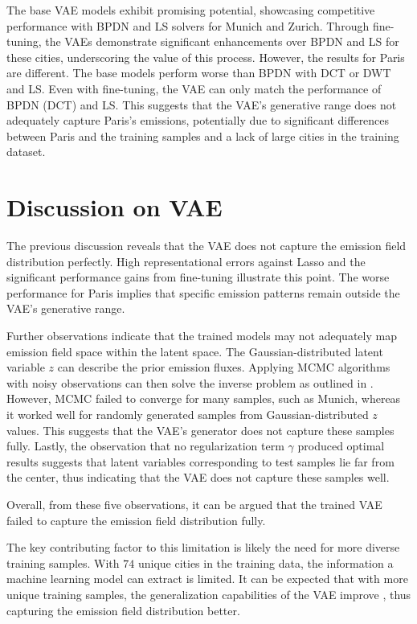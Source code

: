 The base \gls{VAE} models exhibit promising potential, showcasing competitive performance with \gls{BPDN} and \gls{LS} solvers for Munich and Zurich.
Through fine-tuning, the \gls{VAE}s demonstrate significant enhancements over \gls{BPDN} and \gls{LS} for these cities, underscoring the value of this process.
However, the results for Paris are different.
The base models perform worse than \gls{BPDN} with \gls{DCT} or \gls{DWT} and \gls{LS}.
Even with fine-tuning, the \gls{VAE} can only match the performance of \gls{BPDN} (\gls{DCT}) and \gls{LS}.
This suggests that the \gls{VAE}'s generative range does not adequately capture Paris's emissions, potentially due to significant differences between Paris and the training samples and a lack of large cities in the training dataset.

\section{Discussion on VAE}

The previous discussion reveals that the \gls{VAE} does not capture the emission field distribution perfectly.
High representational errors against \gls{Lasso} and the significant performance gains from fine-tuning illustrate this point.
The worse performance for Paris implies that specific emission patterns remain outside the \gls{VAE}’s generative range.

Further observations indicate that the trained models may not adequately map emission field space within the latent space.
The Gaussian-distributed latent variable $z$ can describe the prior emission fluxes.
Applying \gls{MCMC} \parencite{MCMC} algorithms with noisy observations can then solve the inverse problem as outlined in \cite{VAE-MCMC}.
However, \gls{MCMC} failed to converge for many samples, such as Munich, whereas it worked well for randomly generated samples from Gaussian-distributed $z$ values.
This suggests that the \gls{VAE}’s generator does not capture these samples fully.
Lastly, the observation that no regularization term $\gamma$ produced optimal results suggests that latent variables corresponding to test samples lie far from the center, thus indicating that the \gls{VAE} does not capture these samples well.

Overall, from these five observations, it can be argued that the trained \gls{VAE} failed to capture the emission field distribution fully.

The key contributing factor to this limitation is likely the need for more diverse training samples.
With $74$ unique cities in the training data, the information a machine learning model can extract is limited.
It can be expected that with more unique training samples, the generalization capabilities of the \gls{VAE} improve \parencite{limited-data}, thus capturing the emission field distribution better.


